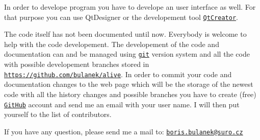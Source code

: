 In order to develope program you have to develope an user interface as well. For that purpose you can use {\ttfamily Qt\-Designer} or the developement tool \href{http://qt.digia.com/Product/Developer-Tools/}{\tt Qt\-Creator}.

The code itself has not been documented until now. Everybody is welcome to help with the code developement. The developement of the code and documentation can and be managed using \href{http://git-scm.com/}{\tt git} version system and all the code with possible developement branches stored in \href{https://github.com/bulanek/alive}{\tt https\-://github.\-com/bulanek/alive}. In order to commit your code and documentation changes to the web page which will be the storage of the newest code with all the history changes and possible branches you have to create (free) \href{https://github.com/}{\tt Git\-Hub} account and send me an email with your user name. I will then put yourself to the list of contributors.

If you have any question, please send me a mail to\-: \href{mailto:boris.bulanek@suro.cz}{\tt boris.\-bulanek@suro.\-cz} 